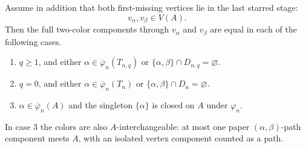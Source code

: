 \begin{lemma}
Assume in addition that both first-missing vertices lie in the last
starred stage:
\[
        v_\alpha,v_\beta\in V(A).
\]
Then the full two-color components through $v_\alpha$ and $v_\beta$
are equal in each of the following cases.
\begin{enumerate}
\item $q\geq1$, and either
$\alpha\in\overline\varphi_n(T_{n,q})$ or
$\{\alpha,\beta\}\cap D_{n,q}=\varnothing$.
\item $q=0$, and either
$\alpha\in\overline\varphi_n(T_n)$ or
$\{\alpha,\beta\}\cap D_n=\varnothing$.
\item $\alpha\in\overline\varphi_n(A)$ and the singleton
$\{\alpha\}$ is closed on $A$ under $\varphi_n$.
\end{enumerate}
In case 3 the colors are also $A$-interchangeable: at most one paper
$(\alpha,\beta)$-path component meets $A$, with an isolated vertex
component counted as a path.
\end{lemma}
